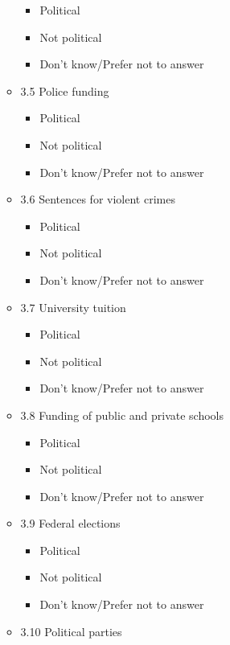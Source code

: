 \documentclass[
  letterpaper,
  DIV=11,
  numbers=noendperiod]{scrreprt}
\providecommand{\tightlist}{%
  \setlength{\itemsep}{0pt}\setlength{\parskip}{0pt}}\usepackage{longtable,booktabs,array}
\begin{document}
\begin{enumerate}
\begin{itemize}
    \begin{itemize}
    \tightlist
    \item
      Political
    \item
      Not political
    \item
      Don't know/Prefer not to answer
    \end{itemize}
  \item
    3.5 Police funding

    \begin{itemize}
    \tightlist
    \item
      Political
    \item
      Not political
    \item
      Don't know/Prefer not to answer
    \end{itemize}
  \item
    3.6 Sentences for violent crimes

    \begin{itemize}
    \tightlist
    \item
      Political
    \item
      Not political
    \item
      Don't know/Prefer not to answer
    \end{itemize}
  \item
    3.7 University tuition

    \begin{itemize}
    \tightlist
    \item
      Political
    \item
      Not political
    \item
      Don't know/Prefer not to answer
    \end{itemize}
  \item
    3.8 Funding of public and private schools

    \begin{itemize}
    \tightlist
    \item
      Political
    \item
      Not political
    \item
      Don't know/Prefer not to answer
    \end{itemize}
  \item
    3.9 Federal elections

    \begin{itemize}
    \tightlist
    \item
      Political
    \item
      Not political
    \item
      Don't know/Prefer not to answer
    \end{itemize}
  \item
    3.10 Political parties


\end{itemize}
\end{enumerate}
\end{document}
